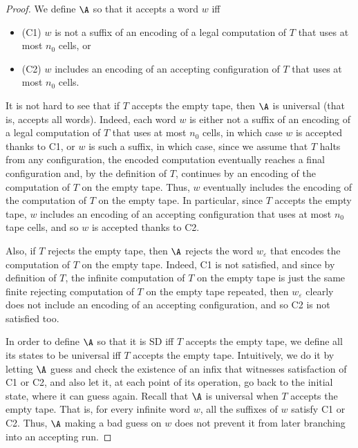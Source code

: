 \documentclass{lmcs}
\begin{document}
\begin{proof}
We define $\A$ so that it accepts a word $w$ iff 
\begin{itemize}
\item
(C1) $w$ is not a suffix of an encoding of a legal computation of $T$ that uses at most $n_0$ cells,
or 
\item
(C2) $w$ includes an encoding of an accepting configuration of $T$ that uses at most $n_0$ cells. 
\end{itemize}
It is not hard to see that if $T$ accepts the empty tape, then $\A$ is universal (that is, accepts all words). Indeed, each word $w$ is either not a suffix of an encoding of a legal computation of $T$ 
that uses at most $n_0$ cells, 
in which case $w$ is accepted thanks to C1, or $w$ is such a suffix, in which case, since we assume that $T$ halts from any configuration, the encoded computation eventually reaches a final configuration and, by the definition of $T$, continues by an encoding of the computation of $T$ on the empty tape. Thus, $w$ eventually includes the encoding of the computation of $T$ on the empty tape. In particular, since $T$ accepts the empty tape, $w$ includes an encoding of an accepting configuration that uses at most $n_0$ tape cells, and so $w$ is accepted thanks to C2.

Also, if $T$ rejects the empty tape, then $\A$ rejects the word $w_\varepsilon$ that encodes the computation of $T$ on the empty tape. Indeed, C1 is not satisfied, and since by definition of $T$, the infinite computation of $T$ on the empty tape is just the same finite rejecting computation of $T$ on the empty tape repeated, then $w_\varepsilon$ clearly does not include an encoding of an accepting configuration, and so C2 is not satisfied too. 

In order to define $\A$ so that it is SD iff $T$ accepts the empty tape, we define all its states to be universal iff $T$ accepts the empty tape. Intuitively, we do it by letting $\A$ guess and check the existence of an infix that witnesses  satisfaction of C1 or C2, and also let it, at each point of its operation, go back to the initial state, where it can guess again. Recall that $\A$ is universal when $T$ accepts the empty tape. That is, for every infinite word $w$, all the suffixes of $w$ satisfy C1 or C2. Thus, $\A$ making a bad guess on $w$ does not prevent it from later branching into an accepting run.


\end{proof}
\end{document}
